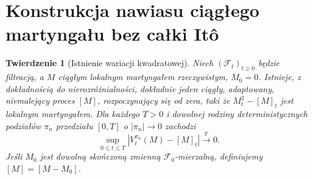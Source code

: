 \documentclass[11pt,a4paper,oneside]{report}
\numberwithin{equation}{chapter}
\theoremstyle{plain}
\newtheorem{twierdzenie}{Twierdzenie}[chapter]
\theoremstyle{definition}
\theoremstyle{remark}
\newcommand{\Prob}{\mathbb{P}}
\newcommand{\calF}{\mathcal{F}}
\begin{document}
\section{Konstrukcja nawiasu ciągłego martyngału bez całki Itô}
\begin{twierdzenie}[Istnienie wariacji kwadratowej]
\label{thm:general-bracket}
Niech $(\calF_t)_{t\ge0}$ będzie filtracją,
a $M$ ciągłym lokalnym martyngałem rzeczywistym,
$M_0=0$. Istnieje, z dokładnością do nierozróżnialności, dokładnie jeden
ciągły, adaptowany, niemalejący proces $[M]$, rozpoczynający się od zera,
taki że $M_t^2-[M]_t$ jest lokalnym martyngałem.
Dla każdego $T>0$ i dowolnej rodziny deterministycznych
podziałów $\pi_n$ przedziału $[0,T]$ o
$|\pi_n|\to0$ zachodzi
\[
\sup_{0\le t\le T}|V_t^{\pi_n}(M)-[M]_t|
\xrightarrow{\Prob}0.
\]
Jeśli $M_0$ jest dowolną skończoną zmienną
$\calF_0$-mierzalną, definiujemy $[M]=[M-M_0]$.
\end{twierdzenie}
\end{document}

